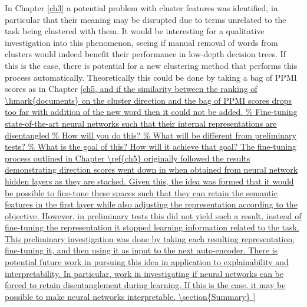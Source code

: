 
In Chapter \ref{ch3} a potential problem with cluster features was identified, in particular that their  meaning may be disrupted due to terms unrelated to the task being clustered with them. It would be interesting for a qualitative investigation into this phenomenon, seeing if manual removal of words from clusters would indeed benefit their performance in low-depth decision trees. If this is the case, there is potential for a new clustering method that performs this process automatically. Theoretically this could be done by taking a bag of PPMI scores as in Chapter \ref{ch5, and if the similarity between the ranking of \hmark{documents} on the cluster direction and the bag of PPMI scores drops too far with addition of the new word then it could not be added. 




The fine-tuning process outlined in Chapter \ref{ch5} originally followed the results demonstrating  direction scores went down in when obtained from neural network hidden layers as they are  stacked. Given this, the idea was formed that it would be possible to fine-tune these spaces such that they can retain the semantic features in the first layer while also adjusting the representation according to the objective. However, in preliminary tests this did not yield such a result, instead of fine-tuning the representation it stopped learning information related to the task. This preliminary investigation was done by taking each resulting representation, fine-tuning it, and then using it as input to the next auto-encoder. There is potential future work in pursuing this idea in application to explainability and interpretability. In particular, work in investigating if neural networks can be forced to retain disentanglement during learning. If this is the case, it may be possible to make neural networks interpretable.




\section{Summary}

}
